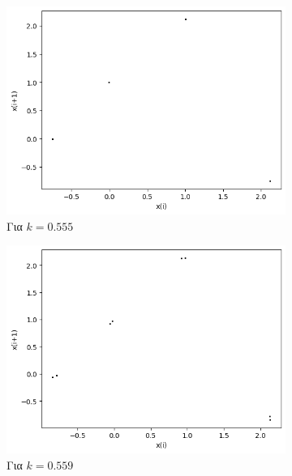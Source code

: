 \begin{figure}[ht]
\begin{subfigure}[c]{0.4\textwidth}
		\includegraphics[width=\textwidth]{LateX images/graphs/k0555}
		\caption{Για $k=0.555$}
		\label{f:k10}
	\end{subfigure}
	\hfill
	\begin{subfigure}[c]{0.4\textwidth}
		\centering
		\includegraphics[width=\textwidth]{LateX images/graphs/k0559}
		\caption{Για $k=0.559$}
		\label{f:k11}
	\end{subfigure}
	\hfill
	\begin{subfigure}[c]{0.4\textwidth}
		\centering

\end{subfigure}
\end{figure}
